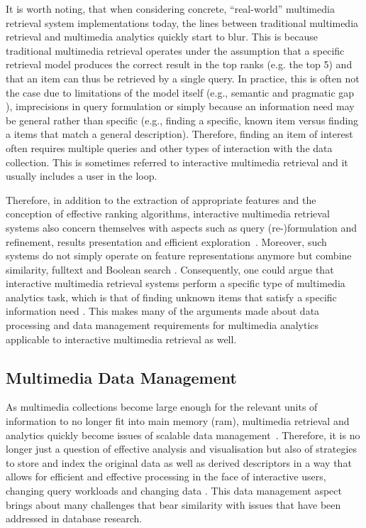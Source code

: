 It is worth noting, that when considering concrete, ``real-world'' multimedia retrieval system implementations today, the lines between traditional multimedia retrieval and multimedia analytics quickly start to blur. This is because traditional multimedia retrieval operates under the assumption that a specific retrieval model produces the correct result in the top ranks (e.g. the top 5) and that an item can thus be retrieved by a single query. In practice, this is often not the case due to limitations of the model itself (e.g., semantic and pragmatic gap \cite{Zahalka:2014Towards}), imprecisions in query formulation or simply because an information need may be general rather than specific (e.g., finding a specific, known item versus finding a items that match a general description). Therefore, finding an item of interest often requires multiple queries and other types of interaction with the data collection. This is sometimes referred to interactive multimedia retrieval and it usually includes a user in the loop.

Therefore, in addition to the extraction of appropriate features and the conception of effective ranking algorithms, interactive multimedia retrieval systems also concern themselves with aspects such as query (re-)formulation and refinement, results presentation and efficient exploration~\cite{Lokovc:2019Interactive}. Moreover, such systems do not simply operate on feature representations anymore but combine similarity, fulltext and Boolean search \cite{Rossetto:2020Interactive}. Consequently, one could argue that interactive multimedia retrieval systems perform a specific type of multimedia analytics task, which is that of finding unknown items that satisfy a specific information need \cite{Seebacher:2017Visual}. This makes many of the arguments made about data processing and data management requirements for multimedia analytics applicable to interactive multimedia retrieval as well.

\subsection{Multimedia Data Management}

As multimedia collections become large enough for the relevant units of information to no longer fit into main memory (\acrshort{ram}), multimedia retrieval and analytics quickly become issues of scalable data management~\cite{Jonsson:2016Ten,Pouyanfar:2018,Vrochidis:2019Big}. Therefore, it is no longer just a question of effective analysis and visualisation but also of strategies to store and index the original data as well as derived descriptors in a way that allows for efficient and effective processing in the face of interactive users, changing query workloads and changing data \cite{Smeulders:2000Content}. This data management aspect brings about many challenges that bear similarity with issues that have been addressed in database research.


